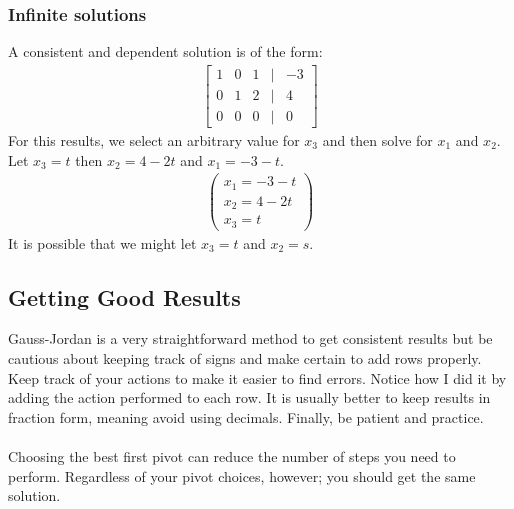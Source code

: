 \documentclass[14pt]{extarticle}
\begin{document}
\subsubsection*{Infinite solutions}
A consistent and dependent solution is of the form:
\begin{align*}
	\begin{bmatrix}
		1 & 0 & 1 & | & -3 \\
		0 & 1 & 2 & | & 4 \\
		0 & 0 & 0 & | & 0
	\end{bmatrix}
\end{align*}
For this results, we select an arbitrary value for $x_3$ and then solve for $x_1$ and $x_2$. Let $x_3=t$ then $x_2 = 4-2t$ and $x_1=-3-t$.
\begin{align*}
	\begin{pmatrix}
		x_1 = -3-t	\\
		x_2 = 4 -2t	\\
		x_3 = t	
	\end{pmatrix}
\end{align*}
It is possible that we might let $x_3 = t$ and $x_2=s$.

\subsection*{Getting Good Results}
Gauss-Jordan is a very straightforward method to get consistent results but be cautious about keeping track of signs and make certain to add rows properly. Keep track of your actions to make it easier to find errors. Notice how I did it by adding the action performed to each row. It is usually better to keep results in fraction form, meaning avoid using decimals. Finally, be patient and practice.
\\\\
Choosing the best first pivot can reduce the number of steps you need to perform. Regardless of your pivot choices, however; you should get the same solution.

\cleardoublepage
\end{document}
